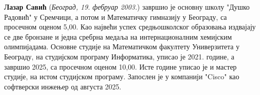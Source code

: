 \documentclass[12pt,oneside]{memoir}
\begin{document}
\begin{biografija}
\textbf{Лазар Савић} (\emph{Београд, 19. фебруар 2003.}) 
завршио је основну школу "Душко Радовић" у Сремчици, а потом
и Математичку гимназију у Београду, са просечном оценом 5,00. Као највећи успех средњошколског 
образовања издвајају се две бронзане и једна сребрна медаља 
на интернационалним хемијским олимпијадама. 
Основне студије на Математичком 
факултету Универзитета у Београду, на студијском програму Информатика, уписао је 
2021. године, а завршио 2025, са просечном оценом 10,00. Исте године 
уписао је и мастер студије, на истом студијском програму. 
Запослен је у компанији "Cisco" као софтверски инжењер од августа 2025.
\end{biografija}
\end{document}
